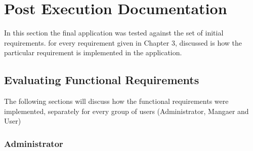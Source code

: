 \documentclass[a4paper,11pt,twoside]{report}
\theoremstyle{definition}
\begin{document}

\chapter{Post Execution Documentation}

In this section the final application was tested against the set of initial requirements. for every requirement given in Chapter 3, discussed is how the particular requirement is implemented in the application.

\section{Evaluating Functional Requirements}

The following sections will discuss how the functional requirements were implemented, separately for every group of users (Administrator, Mangaer and User)

\subsection{Administrator}
\end{document}
